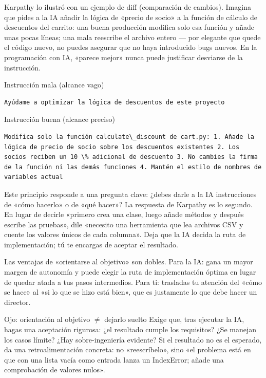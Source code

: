 Karpathy lo ilustró con un ejemplo de diff (comparación de cambios). Imagina que pides a la IA añadir la lógica de «precio de socio» a la función de cálculo de descuentos del carrito: una buena producción modifica solo esa función y añade unas pocas líneas; una mala reescribe el archivo entero — por elegante que quede el código nuevo, no puedes asegurar que no haya introducido bugs nuevos. En la programación con IA, «parece mejor» nunca puede justificar desviarse de la instrucción.

Instrucción mala (alcance vago)

\begin{lstlisting}
Ayúdame a optimizar la lógica de descuentos de este proyecto
\end{lstlisting}

Instrucción buena (alcance preciso)

\begin{lstlisting}
Modifica solo la función calculate\_discount de cart.py: 1. Añade la lógica de precio de socio sobre los descuentos existentes 2. Los socios reciben un 10 \% adicional de descuento 3. No cambies la firma de la función ni las demás funciones 4. Mantén el estilo de nombres de variables actual
\end{lstlisting}


Este principio responde a una pregunta clave: ¿debes darle a la IA instrucciones de «cómo hacerlo» o de «qué hacer»? La respuesta de Karpathy es lo segundo. En lugar de decirle «primero crea una clase, luego añade métodos y después escribe las pruebas», dile «necesito una herramienta que lea archivos CSV y cuente los valores únicos de cada columna». Deja que la IA decida la ruta de implementación; tú te encargas de aceptar el resultado.

Las ventajas de «orientarse al objetivo» son dobles. Para la IA: gana un mayor margen de autonomía y puede elegir la ruta de implementación óptima en lugar de quedar atada a tus pasos intermedios. Para ti: trasladas tu atención del «cómo se hace» al «si lo que se hizo está bien», que es justamente lo que debe hacer un director.

\begin{tcbwarn}{Ojo: orientación al objetivo $\neq$ dejarlo suelto}
Exige que, tras ejecutar la IA, hagas una aceptación rigurosa: ¿el resultado cumple los requisitos? ¿Se manejan los casos límite? ¿Hay sobre-ingeniería evidente? Si el resultado no es el esperado, da una retroalimentación concreta: no «reescríbelo», sino «el problema está en que con una lista vacía como entrada lanza un IndexError; añade una comprobación de valores nulos».

\end{tcbwarn}

